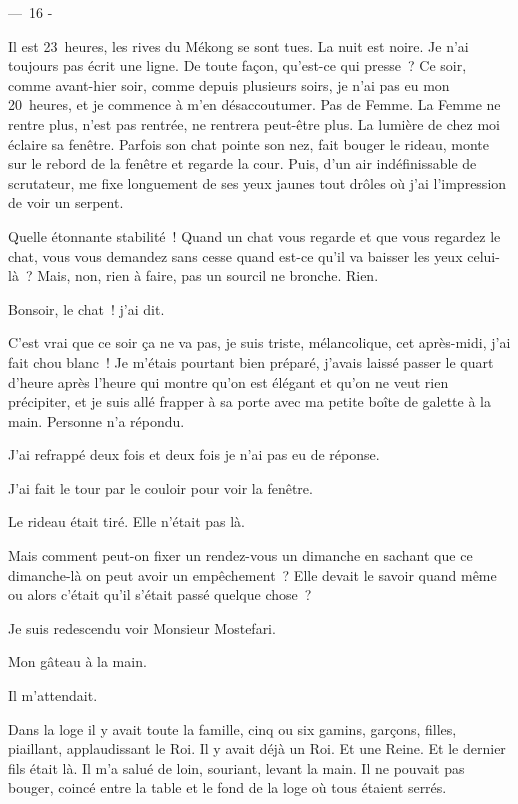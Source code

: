 \documentclass[french,twoside]{book} %
\begin{document}
\begin{center}
— 16 -\par
\end{center}

\bigbreak
\noindent Il est 23 heures, les rives du Mékong se sont tues. La nuit est noire. Je n’ai toujours pas écrit une ligne. De toute façon, qu’est-ce qui presse ? Ce soir, comme avant-hier soir, comme depuis plusieurs soirs, je n’ai pas eu mon 20 heures, et je commence à m’en désaccoutumer. Pas de Femme. La Femme ne rentre plus, n’est pas rentrée, ne rentrera peut-être plus. La lumière de chez moi éclaire sa fenêtre. Parfois son chat pointe son nez, fait bouger le rideau, monte sur le rebord de la fenêtre et regarde la cour. Puis, d’un air indéfinissable de scrutateur, me fixe longuement de ses yeux jaunes tout drôles où j’ai l’impression de voir un serpent.\par
Quelle étonnante stabilité ! Quand un chat vous regarde et que vous regardez le chat, vous vous demandez sans cesse quand est-ce qu’il va baisser les yeux celui-là ? Mais, non, rien à faire, pas un sourcil ne bronche. Rien.\par
Bonsoir, le chat ! j’ai dit.\par
C’est vrai que ce soir ça ne va pas, je suis triste, mélancolique, cet après-midi, j’ai fait chou blanc ! Je m’étais pourtant bien préparé, j’avais laissé passer le quart d’heure après l’heure qui montre qu’on est élégant et qu’on ne veut rien précipiter, et je suis allé frapper à sa porte avec ma petite boîte de galette à la main. Personne n’a répondu.\par
J’ai refrappé deux fois et deux fois je n’ai pas eu de réponse.\par
J’ai fait le tour par le couloir pour voir la fenêtre.\par
Le rideau était tiré. Elle n’était pas là.\par
Mais comment peut-on fixer un rendez-vous un dimanche en sachant que ce dimanche-là on peut avoir un empêchement ? Elle devait le savoir quand même ou alors c’était qu’il s’était passé quelque chose ?\par
Je suis redescendu voir Monsieur Mostefari.\par
Mon gâteau à la main.\par
Il m’attendait.\par
Dans la loge il y avait toute la famille, cinq ou six gamins, garçons, filles, piaillant, applaudissant le Roi. Il y avait déjà un Roi. Et une Reine. Et le dernier fils était là. Il m’a salué de loin, souriant, levant la main. Il ne pouvait pas bouger, coincé entre la table et le fond de la loge où tous étaient serrés.\par
\end{document}
